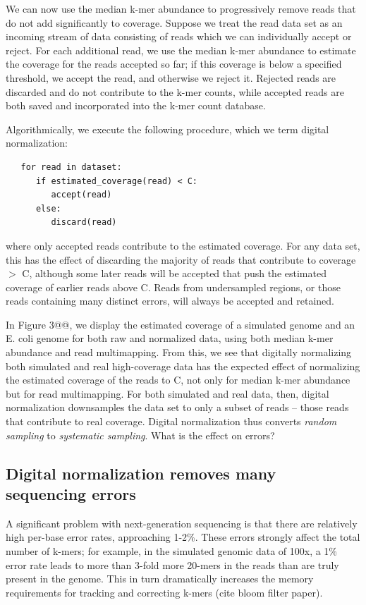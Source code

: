 \documentclass[10pt,draft]{article}
\begin{document}
We can now use the median k-mer abundance to progressively remove
reads that do not add significantly to coverage.  Suppose we treat the
read data set as an incoming stream of data consisting of reads which
we can individually accept or reject.  For each additional read, we
use the median k-mer abundance to estimate the coverage for the reads
accepted so far; if this coverage is below a specified threshold, we
accept the read, and otherwise we reject it.  Rejected reads are
discarded and do not contribute to the k-mer counts, while accepted
reads are both saved and incorporated into the k-mer count database.

Algorithmically, we execute the following procedure, which we term
digital normalization:

\begin{verbatim}
   for read in dataset:
      if estimated_coverage(read) < C:
         accept(read)
      else:
         discard(read)
\end{verbatim}

where only accepted reads contribute to the estimated coverage.  For any
data set, this has the effect of discarding the majority of reads that
contribute to coverage $>$ C, although some later reads will be accepted
that push the estimated coverage of earlier reads above C.  Reads from
undersampled regions, or those reads containing many distinct errors, will always
be accepted and retained.

In Figure 3@@, we display the estimated coverage of a simulated genome
and an E. coli genome for both raw and normalized data, using both
median k-mer abundance and read multimapping.  From this, we see that
digitally normalizing both simulated and real high-coverage data has
the expected effect of normalizing the estimated coverage of the reads
to C, not only for median k-mer abundance but for read multimapping.
For both simulated and real data, then, digital normalization
downsamples the data set to only a subset of reads -- those reads that
contribute to real coverage.  Digital normalization thus converts {\em
random sampling} to {\em systematic sampling}.  What is the effect on
errors?

\subsection*{Digital normalization removes many sequencing errors}

A significant problem with next-generation sequencing is that there
are relatively high per-base error rates, approaching 1-2\%.  These
errors strongly affect the total number of k-mers; for example, in the
simulated genomic data of 100x, a 1\% error rate leads to more than
3-fold more 20-mers in the reads than are truly present in the genome.
This in turn dramatically increases the memory requirements for
tracking and correcting k-mers (cite bloom filter paper).
\end{document}
